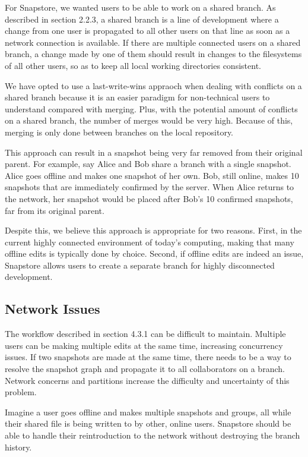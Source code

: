 For Snapstore, we wanted users to be able to work on a shared branch. As described in section 2.2.3, a shared branch is a line of development where a change from one user is propagated to all other users on that line as soon as a network connection is available. If there are multiple connected users on a shared branch, a change made by one of them should result in changes to the filesystems of all other users, so as to keep all local working directories consistent.

We have opted to use a last-write-wins appraoch when dealing with conflicts on a shared branch because it is an easier paradigm for non-technical users to understand compared with merging. Plus, with the potential amount of conflicts on a shared branch, the number of merges would be very high. Because of this, merging is only done between branches on the local repository.

This approach can result in a snapshot being very far removed from their original parent. For example, say Alice and Bob share a branch with a single snapshot. Alice goes offline and makes one snapshot of her own. Bob, still online, makes 10 snapshots that are immediately confirmed by the server. When Alice returns to the network, her snapshot would be placed after Bob's 10 confirmed snapshots, far from its original parent.

Despite this, we believe this approach is appropriate for two reasons. First, in the current highly connected environment of today's computing, making that many offline edits is typically done by choice. Second, if offline edits are indeed an issue, Snapstore allows users to create a separate branch for highly disconnected development. 

\subsection{Network Issues}

The workflow described in section 4.3.1 can be difficult to maintain. Multiple users can be making multiple edits at the same time, increasing concurrency issues. If two snapshots are made at the same time, there needs to be a way to resolve the snapshot graph and propagate it to all collaborators on a branch. Network concerns and partitions increase the difficulty and uncertainty of this problem. 

Imagine a user goes offline and makes multiple snapshots and groups, all while their shared file is being written to by other, online users. Snapstore should be able to handle their reintroduction to the network without destroying the branch history.

